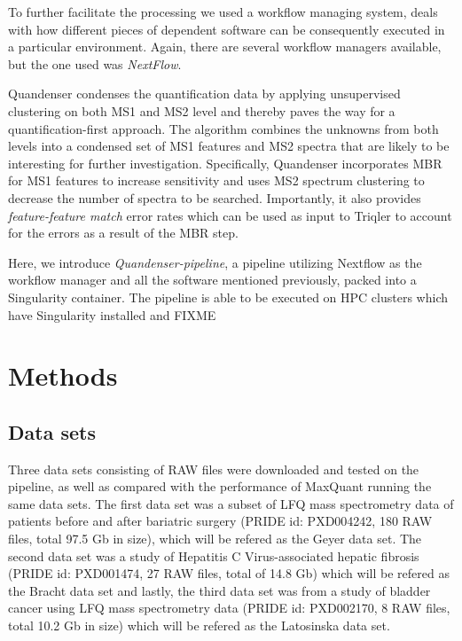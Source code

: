 \documentclass[11pt]{article}
\begin{document}
To further facilitate the processing we used a workflow managing system, deals with how different pieces of dependent software can be consequently executed in a particular environment. Again, there are several workflow managers available, but the one used was \textit{NextFlow}\cite{di2017nextflow}.

Quandenser condenses the quantification data by applying unsupervised clustering on both MS1 and MS2 level and thereby paves the way for a quantification-first approach. The algorithm combines the unknowns from both levels into a condensed set of MS1 features and MS2 spectra that are likely to be interesting for further investigation. Specifically, Quandenser incorporates MBR for MS1 features to increase sensitivity and uses MS2 spectrum clustering to decrease the number of spectra to be searched. Importantly, it also provides {\em feature-feature match} error rates which can be used as input to Triqler to account for the errors as a result of the MBR step.

Here, we introduce \textit{Quandenser-pipeline}, a pipeline utilizing Nextflow as the workflow manager and all the software mentioned previously, packed into a Singularity container. The pipeline is able to be executed on HPC clusters which have Singularity installed and FIXME

\section*{Methods}

\subsection*{Data sets}
Three data sets consisting of RAW files were downloaded and tested on the pipeline, as well as compared with the performance of MaxQuant running the same data sets. The first data set was a subset of LFQ mass spectrometry data of patients before and after bariatric surgery (PRIDE id: PXD004242, 180 RAW files, total 97.5 Gb in size), which will be refered as the Geyer data set. The second data set was a study of Hepatitis C Virus-associated hepatic fibrosis (PRIDE id: PXD001474, 27 RAW files, total of 14.8 Gb) which will be refered as the Bracht data set and lastly, the third data set was from a study of bladder cancer using LFQ mass spectrometry data (PRIDE id: PXD002170, 8 RAW files, total 10.2 Gb in size) which will be refered as the Latosinska data set.
\end{document}
